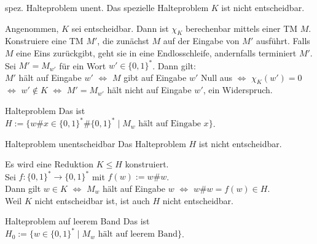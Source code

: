 \begin{Satz}{spez. Halteproblem unent.}
    Das spezielle Halteproblem $K$ ist nicht entscheidbar.
\end{Satz}

\begin{Beweis}
    Angenommen, $K$ sei entscheidbar.
    Dann ist $\chi_K$ berechenbar mittels einer TM $M$.
    Konstruiere eine TM $M'$, die zunächst $M$ auf der Eingabe von $M'$ ausführt.
    Falls $M$ eine Eins zurückgibt, geht sie in eine Endlosschleife,
    andernfalls terminiert $M'$.\\
    Sei $M' = M_{w'}$ für ein Wort $w' \in \{0, 1\}^\ast$.
    Dann gilt:\\
    $M'$ hält auf Eingabe $w'$ $\iff$
    $M$ gibt auf Eingabe $w'$ Null aus $\iff$
    $\chi_K(w') = 0$ $\iff$
    $w' \notin K$ $\iff$
    $M' = M_{w'}$ hält nicht auf Eingabe $w'$,
    ein Widerspruch.
\end{Beweis}

\linie

\begin{Def}{Halteproblem}
    Das  ist\\
    $H := \{w\# x \in \{0, 1\}^\ast \# \{0, 1\}^\ast \;|\;
    M_w \text{ hält auf Eingabe } x\}$.
\end{Def}

\begin{Satz}{Halteproblem unentscheidbar}
    Das Halteproblem $H$ ist nicht entscheidbar.
\end{Satz}

\begin{Beweis}
    Es wird eine Reduktion $K \le H$ konstruiert.\\
    Sei $f\colon \{0, 1\}^\ast \rightarrow \{0, 1\}^\ast$ mit
    $f(w) := w\# w$.\\
    Dann gilt $w \in K$ $\iff$
    $M_w$ hält auf Eingabe $w$ $\iff$
    $w\# w = f(w) \in H$.\\
    Weil $K$ nicht entscheidbar ist, ist auch $H$ nicht entscheidbar.
\end{Beweis}

\linie

\begin{Def}{Halteproblem auf leerem Band}
    Das  ist\\
    $H_0 := \{w \in \{0, 1\}^\ast \;|\; M_w \text{ hält auf leerem Band}\}$.
\end{Def}

